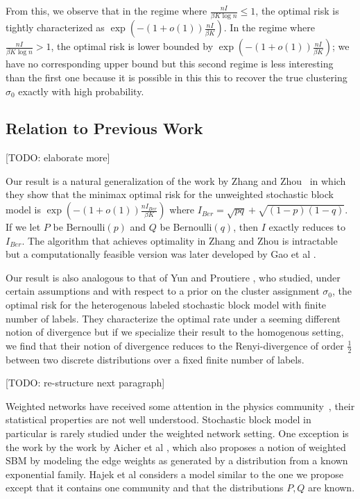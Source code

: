 \documentclass{article}
\begin{document}
From this, we observe that in the regime where $\frac{n I}{\beta K \log n} \leq 1$, the optimal risk is tightly characterized as $\exp \left( - (1 + o(1)) \frac{ n I}{\beta K} \right)$. In the regime where $\frac{n I}{\beta K \log n} > 1$, the optimal risk is lower bounded by  $\exp \left( - (1 + o(1)) \frac{ n I}{\beta K} \right)$; we have no corresponding upper bound but this second regime is less interesting than the first one because it is possible in this this to recover the true clustering $\sigma_0$ exactly with high probability.

\subsection{Relation to Previous Work}

[TODO: elaborate more]

Our result is a natural generalization of the work by Zhang and Zhou~\cite{zhangminimax} in which they show that the minimax optimal risk for the unweighted stochastic block model is $\exp \left( -(1+o(1)) \frac{ n I_{Ber}}{\beta K} \right)$ where $I_{Ber} = \sqrt{pq} + \sqrt{(1-p)(1-q)}$. If we let $P$ be Bernoulli$(p)$ and $Q$ be Bernoulli$(q)$, then $I$ exactly reduces to $I_{Ber}$. The algorithm that achieves optimality in Zhang and Zhou \cite{zhangminimax} is intractable but a computationally feasible version was later developed by Gao et al \cite{GaoEtal15}. 

Our result is also analogous to that of Yun and Proutiere \cite{yun2016optimal}, who studied, under certain assumptions and with respect to a prior on the cluster assignment $\sigma_0$, the optimal risk for the heterogenous labeled stochastic block model with finite number of labels. They characterize the optimal rate under a seeming different notion of divergence but if we specialize their result to the homogenous setting, we find that their notion of divergence reduces to the Renyi-divergence of order $\frac{1}{2}$ between two discrete distributions over a fixed finite number of labels. 

[TODO: re-structure next paragraph]

Weighted networks have received some attention in the physics community~\cite{New04, barrat2004architecture}, their statistical properties are not well understood. Stochastic block model in particular is rarely studied under the weighted network setting. One exception is the work by the work by Aicher et al \cite{aicher2014learning}, which also proposes a notion of weighted SBM by modeling the edge weights as generated by a distribution from a known exponential family. Hajek et al \cite{hajek2017information} considers a model similar to the one we propose except that it contains one community and that the distributions $P, Q$ are known. 
\end{document}
